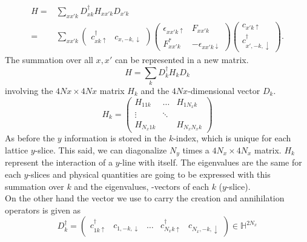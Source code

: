 \documentclass[../main.tex]{subfile}
\begin{document}
\begin{equation}
    \begin{aligned}
    H =& \sum_{xx'k} D_{xk}^{\dagger} H_{xx'k} D_{x'k}\\
      =& \sum_{xx'k} \begin{pmatrix}
        c^{\dagger}_{xk\uparrow} & c_{x,-k,\downarrow}
      \end{pmatrix}
        \begin{pmatrix}
            \epsilon_{xx'k\uparrow} & F_{xx'k}\\
            F_{xx'k}^{\ast} & -\epsilon_{xx'k\downarrow}
        \end{pmatrix}
        \begin{pmatrix}
            c_{x'k\uparrow}\\
            c^{\dagger}_{x',-k,\downarrow}
        \end{pmatrix}.
    \end{aligned}
\end{equation}
The summation over all $x,x'$ can be represented in a new matrix.
\[
    H = \sum_k D_k^{\dagger} H_k D_k
\]
involving the $4Nx \times 4Nx$ matrix $H_k$ and the $4Nx$-dimensional vector $D_k$.
\[
    H_k = \begin{pmatrix}
        H_{11k} &\dots & H_{1N_xk}\\
        \vdots&\ddots&\\
        H_{N_x1k} & & H_{N_xN_xk}
    \end{pmatrix}
\]
As before the $y$ information is stored in the $k$-index, which is unique for each lattice $y$-slice. This said, we 
can diagonalize $N_y$ times a $4N_x \times 4N_x$ matrix. $H_k$ represent the interaction of a $y$-line with itself.
The eigenvalues are the same for each $y$-slices and physical
quantities are going to be expressed with this summation over $k$ and the eigenvalues, -vectors of each $k$ ($y$-slice).\\

On the other hand the vector we use to carry the creation and annihilation operators is given as 
\[
    D_k^{\dagger} = \begin{pmatrix}
        c^{\dagger}_{1k\uparrow} & c_{1,-k,\downarrow}& \dots &c^{\dagger}_{N_x k\uparrow} & c_{N_x,-k,\downarrow}
    \end{pmatrix}\in\mathbb{H}^{2N_x}
\]
\end{document}
